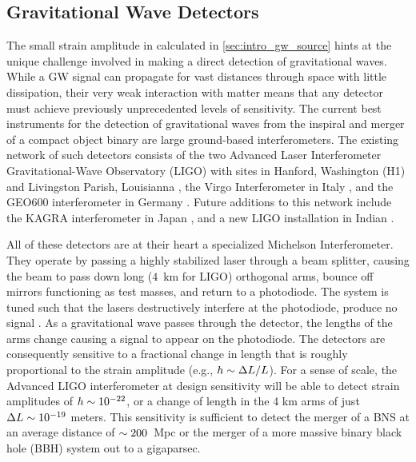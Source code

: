 \subsection{Gravitational Wave Detectors}
\label{sec:intro_gw_det}
The small strain amplitude in calculated in \cref{sec:intro_gw_source} hints at the unique challenge involved in making a direct detection of gravitational waves. While a GW signal can propagate for vast distances through space with little dissipation, their very weak interaction with matter means that any detector must achieve previously unprecedented levels of sensitivity. The current best instruments for the detection of gravitational waves from the inspiral and merger of a compact object binary are large ground-based interferometers. The existing network of such detectors consists of the two Advanced Laser Interferometer Gravitational-Wave Observatory (LIGO) with sites in Hanford, Washington (H1) and Livingston Parish, Louisianna \citep[L1,][]{LIGOEarlyRef,LIGOMainRef}, the Virgo Interferometer in Italy \citep{VirgoC7Burst}, and the GEO600 interferometer in Germany \citep{GEOMainRef}. Future additions to this network include the KAGRA interferometer in Japan \citep{KAGRA}, and a new LIGO installation in Indian \citep[LIGO-India,][]{LIGOIndia}.

All of these detectors are at their heart a specialized Michelson Interferometer. They operate by passing a highly stabilized laser through a beam splitter, causing the beam to pass down long ($4$~km for LIGO) orthogonal arms, bounce off mirrors functioning as test masses, and return to a photodiode. The system is tuned such that the lasers destructively interfere at the photodiode, produce no signal \citep[see e.g.,][and references therein]{LIGOMainRef,Adhikari2014}. As a gravitational wave passes through the detector, the lengths of the arms change causing a signal to appear on the photodiode. The detectors are consequently sensitive to a fractional change in length that is roughly proportional to the strain amplitude (e.g., $h \sim \Delta L / L$). For a sense of scale, the Advanced LIGO interferometer at design sensitivity will be able to detect strain amplitudes of $h \sim 10^{-22}$, or a change of length in the 4 km arms of just $\Delta L \sim 10^{-19}$ meters. This sensitivity is sufficient to detect the merger of a BNS at an average distance of $\sim 200$~Mpc or the merger of a more massive binary black hole (BBH) system out to a gigaparsec.

